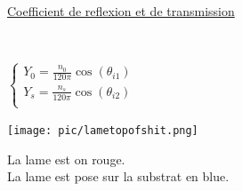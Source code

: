 \documentclass[12pt]{book}
\begin{document}
            \underline{Coefficient de reflexion et de transmission} \\
            \begin{center}
                 \vspace*{20px}
                 \\
                \begin{minipage}{0.3\linewidth}
                    $\begin{cases}
                        Y_0 = \frac{n_0}{120\pi}\cos(\theta_{i1}) \\
                        Y_s = \frac{n_s}{120\pi}\cos(\theta_{i2}) \\
                    \end{cases}$
                \end{minipage}
                \begin{minipage}{0.2\linewidth}
                    \texttt{[image: pic/lametopofshit.png]}\\

                \end{minipage}
                \begin{minipage}{0.29\linewidth}
                    La lame est on rouge. \\
                    La lame est pose sur la substrat en blue.
                \end{minipage}
            \end{center}
\end{document}
